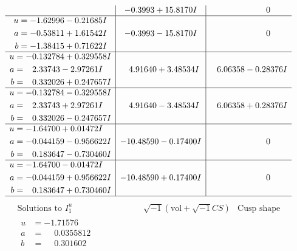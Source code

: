 \documentclass[1p]{elsarticle_modified}
\theoremstyle{definition}
\newcommand{\I}{\sqrt{-1}}
\begin{document}
$$\begin{array}{c|c|c}
 & -0.3993 + 15.8170 I & \phantom{-0.000000 } 0 \\ \hline\begin{aligned}
u &= -1.62996 - 0.21685 I \\
a &= -0.53811 + 1.61542 I \\
b &= -1.38415 + 0.71622 I\end{aligned}
 & -0.3993 - 15.8170 I & \phantom{-0.000000 } 0 \\ \hline\begin{aligned}
u &= -0.132784 + 0.329558 I \\
a &= \phantom{-}2.33743 - 2.97261 I \\
b &= \phantom{-}0.332026 + 0.247657 I\end{aligned}
 & \phantom{-}4.91640 + 3.48534 I & \phantom{-}6.06358 - 0.28376 I \\ \hline\begin{aligned}
u &= -0.132784 - 0.329558 I \\
a &= \phantom{-}2.33743 + 2.97261 I \\
b &= \phantom{-}0.332026 - 0.247657 I\end{aligned}
 & \phantom{-}4.91640 - 3.48534 I & \phantom{-}6.06358 + 0.28376 I \\ \hline\begin{aligned}
u &= -1.64700 + 0.01472 I \\
a &= -0.044159 - 0.956622 I \\
b &= \phantom{-}0.183647 - 0.730460 I\end{aligned}
 & -10.48590 - 0.17400 I & \phantom{-0.000000 } 0 \\ \hline\begin{aligned}
u &= -1.64700 - 0.01472 I \\
a &= -0.044159 + 0.956622 I \\
b &= \phantom{-}0.183647 + 0.730460 I\end{aligned}
 & -10.48590 + 0.17400 I & \phantom{-0.000000 } 0\\
 \hline 
 \end{array}$$\newpage$$\begin{array}{c|c|c}  
\text{Solutions to }I^u_{1}& \I (\text{vol} + \sqrt{-1}CS) & \text{Cusp shape}\\
 \hline 
\begin{aligned}
u &= -1.71576\phantom{ +0.000000I} \\
a &= \phantom{-}0.0355812\phantom{ +0.000000I} \\
b &= \phantom{-}0.301602\phantom{ +0.000000I}\end{aligned}

\end{array}$$
\end{document}
